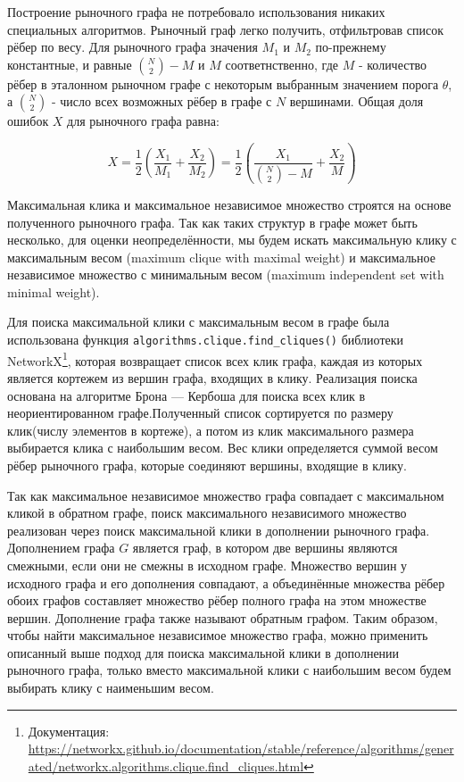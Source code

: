 Построение рыночного графа не потребовало использования никаких специальных алгоритмов. Рыночный граф легко получить, отфильтровав список рёбер по весу. Для рыночного графа значения $M_1$ и $M_2$ по-прежнему константные, и равные $\binom{N}{2} - M$ и $M$ соответнственно, где $M$ - количество рёбер в эталонном рыночном графе с некоторым выбранным значением порога $\theta$, а $\binom{N}{2}$ - число всех возможных рёбер в графе с $N$ вершинами. Общая доля ошибок $X$ для рыночного графа равна:

\begin{equation}
X = \frac{1}{2}\left(\frac{X_1}{M_1} + \frac{X_2}{M_2}\right) = \frac{1}{2}\left(\frac{X_1}{\binom{N}{2} - M} + \frac{X_2}{M}\right)
\end{equation}


Максимальная клика и максимальное независимое множество строятся на основе полученного рыночного графа. Так как таких структур в графе может быть несколько, для оценки неопределённости, мы будем искать максимальную клику с максимальным весом (maximum clique with maximal weight) и максимальное независимое множество с минимальным весом (maximum independent set with minimal weight).  


Для поиска максимальной клики с максимальным весом в графе была использована функция \verb|algorithms.clique.find_cliques()| библиотеки NetworkX\footnote{Документация:  \url{https://networkx.github.io/documentation/stable/reference/algorithms/generated/networkx.algorithms.clique.find_cliques.html}}, которая возвращает список всех клик графа, каждая из которых является кортежем из вершин графа, входящих в клику. Реализация поиска основана на алгоритме Брона — Кербоша\cite{maximum-clique} для поиска всех клик в неориентированном графе.Полученный список сортируется по размеру клик(числу элементов в кортеже), а потом из клик максимального размера выбирается клика с наибольшим весом. Вес клики определяется суммой весом рёбер рыночного графа, которые соединяют вершины, входящие в клику.


Так как максимальное независимое множество графа совпадает с максимальном кликой в обратном графе, поиск максимального независимого множество реализован через поиск максимальной клики в дополнении рыночного графа. Дополнением графа $G$ является граф, в котором две вершины являются смежными, если они не смежны в исходном графе. Множество вершин у исходного графа и его дополнения совпадают, а объединённые множества рёбер обоих графов составляет множество рёбер полного графа на этом множестве вершин. Дополнение графа также называют обратным графом. Таким образом, чтобы найти максимальное независимое множество графа, можно применить описанный выше подход для поиска максимальной клики в дополнении рыночного графа, только вместо максимальной клики с наибольшим весом будем выбирать клику с наименьшим весом.

